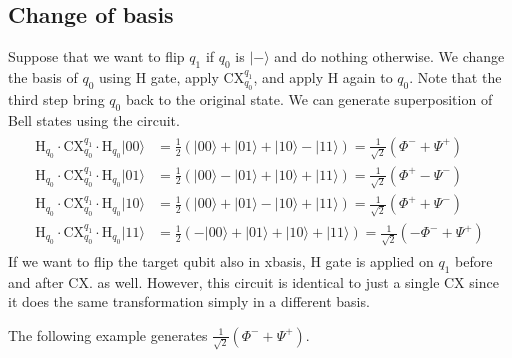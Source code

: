 \documentclass[letterpaper,10pt,english]{jupyterBook}
\begin{document}
\subsection{Change of basis}
\label{\detokenize{q2gates/cx:change-of-basis}}
\sphinxAtStartPar
Suppose that we want to flip \(q_1\)  if \(q_0\) is \(|-\rangle\) and do nothing otherwise.  We change the basis of \(q_0\) using H gate, apply CX\(_{q_0}^{q_1}\), and apply H again to \(q_0\).  Note that the third step bring \(q_0\) back to the original state.  We can generate superposition of Bell states using the circuit.
\begin{equation*}
\begin{split}
\begin{align}
\text{H}_{q_0} \cdot \text{CX}_{q_0}^{q_1} \cdot \text{H}_{q_0} |00\rangle &= \frac{1}{2}\left(|00\rangle + |01\rangle + |10\rangle - |11\rangle \right) = \frac{1}{\sqrt{2}} \left( \Phi^{-} + \Psi^{+} \right) \\
\text{H}_{q_0} \cdot \text{CX}_{q_0}^{q_1} \cdot \text{H}_{q_0} |01\rangle &= \frac{1}{2}\left(|00\rangle - |01\rangle + |10\rangle + |11\rangle \right) = \frac{1}{\sqrt{2}} \left( \Phi^{+} - \Psi^{-} \right) \\
\text{H}_{q_0} \cdot \text{CX}_{q_0}^{q_1} \cdot \text{H}_{q_0} |10\rangle &= \frac{1}{2}\left(|00\rangle + |01\rangle - |10\rangle + |11\rangle \right) = \frac{1}{\sqrt{2}} \left( \Phi^{+} + \Psi^{-} \right) \\
\text{H}_{q_0} \cdot \text{CX}_{q_0}^{q_1} \cdot \text{H}_{q_0} |11\rangle &= \frac{1}{2}\left(-|00\rangle + |01\rangle + |10\rangle + |11\rangle \right) = \frac{1}{\sqrt{2}} \left( -\Phi^{-} + \Psi^{+} \right)
\end{align}
\end{split}
\end{equation*}
\sphinxAtStartPar
If we want to flip the target qubit also in x\sphinxhyphen{}basis, H gate is applied on \(q_1\) before and after CX. as well.  However, this circuit is identical to just a single CX since it does the same transformation simply in a different basis.

\sphinxAtStartPar
The following example generates \(\frac{1}{\sqrt{2}} \left( \Phi^{-} + \Psi^{+} \right)\).
\end{document}
